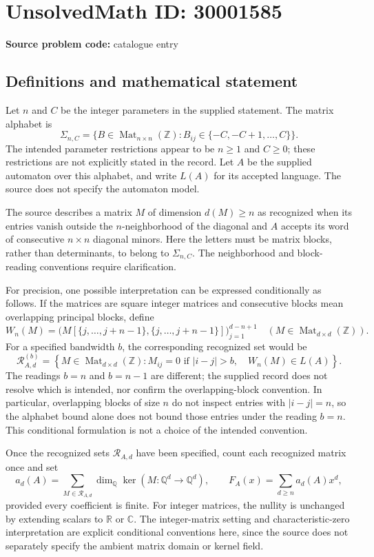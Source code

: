 \documentclass[11pt]{article}
\newcommand{\Z}{\mathbb{Z}}
\newcommand{\Q}{\mathbb{Q}}
\newcommand{\R}{\mathbb{R}}
\newcommand{\C}{\mathbb{C}}
\begin{document}
\section*{UnsolvedMath ID: 30001585}
\textbf{Source problem code:} catalogue entry
\subsection{Definitions and mathematical statement}
Let \(n\) and \(C\) be the integer parameters in the supplied statement. The matrix alphabet is
\[
\Sigma_{n,C}=\{B\in\operatorname{Mat}_{n\times n}(\Z): B_{ij}\in\{-C,-C+1,\ldots,C\}\}.
\]
The intended parameter restrictions appear to be \(n\geq1\) and \(C\geq0\); these restrictions are not explicitly stated in the record. Let \(A\) be the supplied automaton over this alphabet, and write \(L(A)\) for its accepted language. The source does not specify the automaton model.

The source describes a matrix \(M\) of dimension \(d(M)\geq n\) as recognized when its entries vanish outside the \(n\)-neighborhood of the diagonal and \(A\) accepts its word of consecutive \(n\times n\) diagonal minors. Here the letters must be matrix blocks, rather than determinants, to belong to \(\Sigma_{n,C}\). The neighborhood and block-reading conventions require clarification.

For precision, one possible interpretation can be expressed conditionally as follows. If the matrices are square integer matrices and consecutive blocks mean overlapping principal blocks, define
\[
W_n(M)=\bigl(M[\{j,\ldots,j+n-1\},\{j,\ldots,j+n-1\}]\bigr)_{j=1}^{d-n+1}
\quad(M\in\operatorname{Mat}_{d\times d}(\Z)).
\]
For a specified bandwidth \(b\), the corresponding recognized set would be
\[
\mathcal R_{A,d}^{(b)}=
\left\{M\in\operatorname{Mat}_{d\times d}(\Z):
M_{ij}=0\text{ if }|i-j|>b,\quad W_n(M)\in L(A)\right\}.
\]
The readings \(b=n\) and \(b=n-1\) are different; the supplied record does not resolve which is intended, nor confirm the overlapping-block convention. In particular, overlapping blocks of size \(n\) do not inspect entries with \(|i-j|=n\), so the alphabet bound alone does not bound those entries under the reading \(b=n\). This conditional formulation is not a choice of the intended convention.

Once the recognized sets \(\mathcal R_{A,d}\) have been specified, count each recognized matrix once and set
\[
a_d(A)=\sum_{M\in\mathcal R_{A,d}}\dim_{\Q}\ker(M:\Q^d\longrightarrow\Q^d),
\qquad
F_A(x)=\sum_{d\geq n}a_d(A)x^d,
\]
provided every coefficient is finite. For integer matrices, the nullity is unchanged by extending scalars to \(\R\) or \(\C\). The integer-matrix setting and characteristic-zero interpretation are explicit conditional conventions here, since the source does not separately specify the ambient matrix domain or kernel field.
\end{document}
